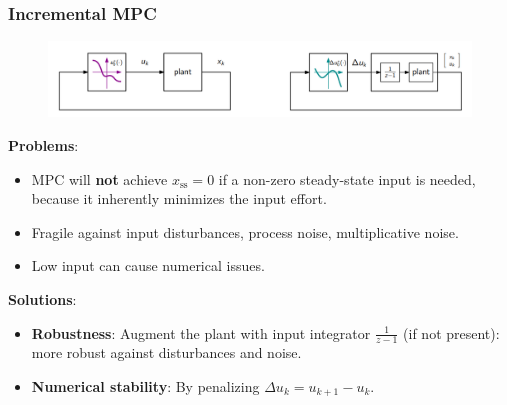 \subsubsection{Incremental MPC}
\begin{figure}[H]
    \centering
    \includegraphics[width=0.8\linewidth]{images/incrementalMPC.png}
\end{figure}
\begin{minipage}[t]{0.48\textwidth}
    \textbf{Problems}:
    \begin{itemize}
        \item MPC will \textbf{not} achieve $x_\mathrm{ss}=0$ if a non-zero steady-state input is needed, because it inherently minimizes the input effort.
        \item Fragile against input disturbances, process noise, multiplicative noise.
        \item Low input can cause numerical issues.
    \end{itemize}
\end{minipage}
\begin{minipage}[t]{0.48\textwidth}
    \textbf{Solutions}:
    \begin{itemize}
        \item \textbf{Robustness}: Augment the plant with input integrator $\frac{1}{z-1}$ (if not present): more robust against disturbances and noise.
        \item \textbf{Numerical stability}: By penalizing $\Delta u_k = u_{k+1} - u_k$.
    \end{itemize}
\end{minipage}


\newpage

